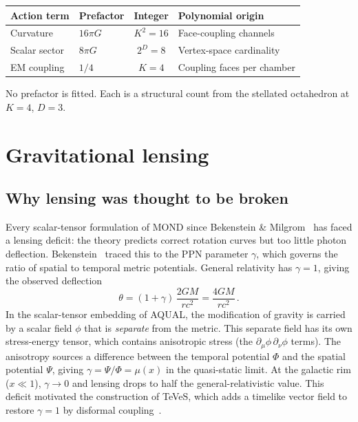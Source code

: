 \documentclass[11pt]{article}
\begin{document}
\begin{center}
\renewcommand{\arraystretch}{1.3}
\begin{tabular}{llcl}
\hline
Action term & Prefactor & Integer & Polynomial origin \\
\hline
Curvature & $16\pi G$ & $K^2 = 16$
  & Face-coupling channels \\
Scalar sector & $8\pi G$ & $2^D = 8$
  & Vertex-space cardinality \\
EM coupling & $1/4$ & $K = 4$
  & Coupling faces per chamber \\
\hline
\end{tabular}
\end{center}

No prefactor is fitted.  Each is a structural count
from the stellated octahedron at $K = 4$, $D = 3$.

\section{Gravitational lensing}

\subsection*{Why lensing was thought to be broken}

Every scalar-tensor formulation of MOND since Bekenstein
\& Milgrom~\cite{BekensteinMilgrom1984} has faced a
lensing deficit: the theory predicts correct rotation
curves but too little photon deflection.
Bekenstein~\cite{Bekenstein2004} traced this to the PPN
parameter $\gamma$, which governs the ratio of spatial to
temporal metric potentials.  General relativity has
$\gamma = 1$, giving the observed deflection
\begin{equation}
  \theta = (1 + \gamma)\,\frac{2GM}{rc^2}
  = \frac{4GM}{rc^2}\,.
  \label{eq:deflection}
\end{equation}
In the scalar-tensor embedding of AQUAL, the modification
of gravity is carried by a scalar field $\phi$ that is
\textit{separate} from the metric.  This separate field
has its own stress-energy tensor, which contains
anisotropic stress (the
$\partial_\mu\phi\,\partial_\nu\phi$ terms).  The
anisotropy sources a difference between the temporal
potential $\Phi$ and the spatial potential $\Psi$, giving
$\gamma = \Psi/\Phi = \mu(x)$ in the quasi-static
limit.  At the galactic rim ($x \ll 1$), $\gamma \to 0$
and lensing drops to half the general-relativistic value.
This deficit motivated the construction of TeVeS, which
adds a timelike vector field to restore $\gamma = 1$ by
disformal coupling~\cite{Bekenstein2004}.
\end{document}
